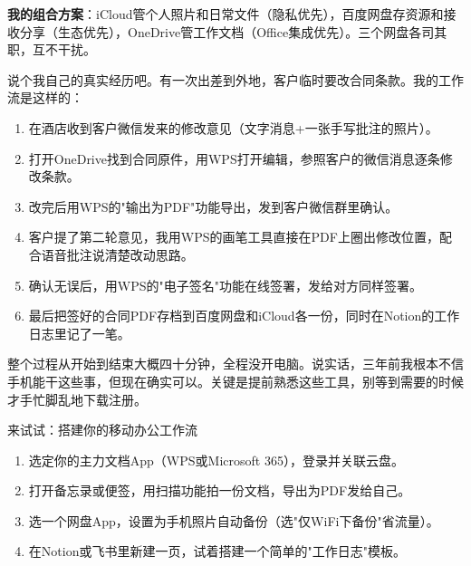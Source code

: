 \textbf{我的组合方案}：iCloud管个人照片和日常文件（隐私优先），百度网盘存资源和接收分享（生态优先），OneDrive管工作文档（Office集成优先）。三个网盘各司其职，互不干扰。


说个我自己的真实经历吧。有一次出差到外地，客户临时要改合同条款。我的工作流是这样的：

\begin{enumerate}
  \item 在酒店收到客户微信发来的修改意见（文字消息+一张手写批注的照片）。
  \item 打开OneDrive找到合同原件，用WPS打开编辑，参照客户的微信消息逐条修改条款。
  \item 改完后用WPS的"输出为PDF"功能导出，发到客户微信群里确认。
  \item 客户提了第二轮意见，我用WPS的画笔工具直接在PDF上圈出修改位置，配合语音批注说清楚改动思路。
  \item 确认无误后，用WPS的"电子签名"功能在线签署，发给对方同样签署。
  \item 最后把签好的合同PDF存档到百度网盘和iCloud各一份，同时在Notion的工作日志里记了一笔。
\end{enumerate}

整个过程从开始到结束大概四十分钟，全程没开电脑。说实话，三年前我根本不信手机能干这些事，但现在确实可以。关键是提前熟悉这些工具，别等到需要的时候才手忙脚乱地下载注册。

\begin{tcbpractice}{来试试：搭建你的移动办公工作流}
\begin{enumerate}
  \item 选定你的主力文档App（WPS或Microsoft 365），登录并关联云盘。
  \item 打开备忘录或便签，用扫描功能拍一份文档，导出为PDF发给自己。
  \item 选一个网盘App，设置为手机照片自动备份（选"仅WiFi下备份"省流量）。
  \item 在Notion或飞书里新建一页，试着搭建一个简单的"工作日志"模板。
\end{enumerate}

\end{tcbpractice}

